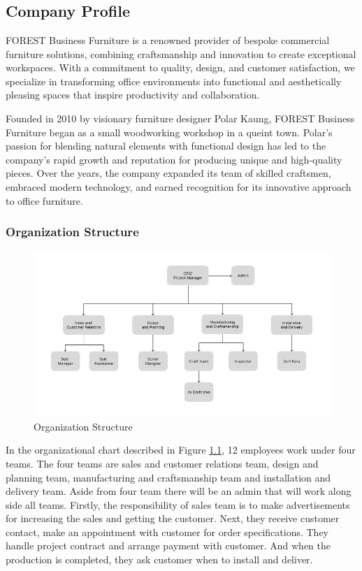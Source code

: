 \chapter[Part 1]{}
\section{Company Profile}
FOREST Business Furniture is a renowned provider of bespoke commercial furniture
solutions, combining craftsmanship and innovation to create exceptional workspaces.
With a commitment to quality, design, and customer satisfaction,
we specialize in transforming office environments into functional and aesthetically
pleasing spaces that inspire productivity and collaboration.


Founded in 2010 by visionary furniture designer Polar Kaung, FOREST Business Furniture began as a small woodworking workshop in a queint town.
Polar's passion for blending natural elements with functional design has led to the company's rapid growth and reputation for producing unique and high-quality pieces.
Over the years, the company expanded its team of skilled craftsmen, embraced modern technology, and earned recognition for its innovative approach to office furniture.

\subsection{Organization Structure}
\begin{figure}[!h]
    \centering
    \includegraphics[scale=0.5]{Organization Structure.png}
    \caption{Organization Structure}
    \label{figure:organization_structure}
\end{figure}
In the organizational chart described in Figure \ref{figure:organization_structure}, 12 employees work under
 four teams. The four teams
are sales and customer relations team, design and planning team, manufacturing and craftsmanship team 
and installation and delivery team. 
Aside from four team there will be an admin that will work along side all teams.
Firstly, the
responsibility of sales team is to make advertisements for increasing the sales and getting
the customer. Next, they receive customer contact, make an appointment with customer
for order specifications. They handle project contract and arrange payment with customer.
And when the production is completed, they ask customer when to install and deliver.



